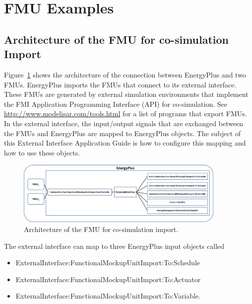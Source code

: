 \section{FMU Examples}\label{fmu-examples}

\subsection{Architecture of the FMU for co-simulation Import}\label{architecture-of-the-fmu-for-co-simulation-import}

Figure~\ref{fig:architecture-of-the-fmu-for-co-simulation} shows the architecture of the connection between EnergyPlus and two FMUs. EnergyPlus imports the FMUs that connect to its external interface. These FMUs are generated by external simulation environments that implement the FMI Application Programming Interface (API) for co-simulation. See \url{http://www.modelisar.com/tools.html} for a list of programs that export FMUs. In the external interface, the input/output signals that are exchanged between the FMUs and EnergyPlus are mapped to EnergyPlus objects. The subject of this External Interface Application Guide is how to configure this mapping and how to use these objects.

\begin{figure}[hbtp] %
\centering
\includegraphics[width=0.9\textwidth, height=0.9\textheight, keepaspectratio=true]{media/image035.png}
\caption{Architecture of the FMU for co-simulation import. \protect \label{fig:architecture-of-the-fmu-for-co-simulation}}
\end{figure}

The external interface can map to three EnergyPlus input objects called

\begin{itemize}
\item
  ExternalInterface:FunctionalMockupUnitImport:To:Schedule
\item
  ExternalInterface:FunctionalMockupUnitImport:To:Actuator
\item
  ExternalInterface:FunctionalMockupUnitImport:To:Variable.
\end{itemize}

